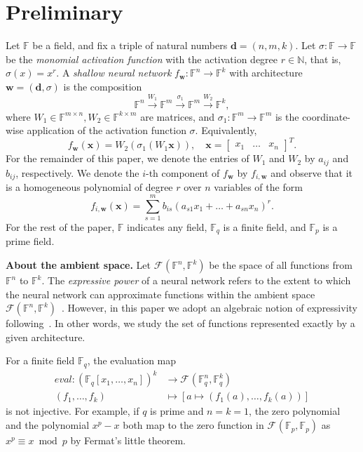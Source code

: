 \documentclass[a4paper]{cas-sc}
\newcommand{\ambSp}[1]{\mathcal{F}_{#1}} %
\newcommand{\xx}{\textbf{x}}    %
\newcommand{\ww}{\mathbf{w}}    %
\newcommand{\dd}{\mathbf{d}}    %
\newcommand{\F}{\mathbb{F}}
\begin{document}
\section{Preliminary}
\label{sec:preliminary}
    Let $\F$ be a field, and fix a triple of natural numbers $\dd=(n,m,k)$. Let $\sigma:\F\to\F$ be the \textit{monomial activation function} with the activation degree $r\in\mathbb{N}$, that is, $\sigma(x)=x^r$. A \textit{shallow neural network} $f_{\ww}:\F^n\to\F^k$ with architecture $\ww=(\dd,\sigma)$ is the composition
    \[
        \F^n\xrightarrow{W_1}\F^m\xrightarrow{\sigma_1}\F^m\xrightarrow{W_2}\F^k,
    \]
    where $W_1\in \F^{m\times n}, W_2\in \F^{k\times m}$ are matrices, and $\sigma_1:\F^m\to\F^m$ is the coordinate-wise application of the activation function $\sigma$. Equivalently,
    \[
        f_{\ww}(\xx)=W_2(\sigma_1(W_1\xx)),\quad \xx=
        \begin{bmatrix}
            x_1 & \dots & x_n
        \end{bmatrix}^T.
    \]
    For the remainder of this paper, we denote the entries of $W_1$ and $W_2$ by $a_{ij}$ and $b_{ij}$, respectively. We denote the $i$-th component of $f_{\ww}$ by $f_{i,\ww}$ and observe that it is a homogeneous polynomial of degree $r$ over $n$ variables of the form
    \begin{equation}
    \label{eq:general-nn-output}
        f_{i,\ww}(\xx)=\sum_{s=1}^{m}b_{is}(a_{s1}x_1+\dots+a_{sn}x_n)^r.
    \end{equation}
    For the rest of the paper, $\F$ indicates any field, $\F_q$ is a finite field, and $\F_p$ is a prime field.

    \noindent
    \textbf{About the ambient space.} Let $\ambSp{}(\F^{n},\F^{k})$ be the space of all functions from $\F^{n}$ to $\F^{k}$. The \textit{expressive power} of a neural network refers to the extent to which the neural network can approximate functions within the ambient space $\mathcal F(\F^{n}, \F^{k})$~\citep{GUHRING20}. However, in this paper we adopt an algebraic notion of expressivity following~\citet{KILEEL19}. In other words, we study the set of functions represented exactly by a given architecture.
    
    
    For a finite field $\F_q$, the evaluation map
    \begin{equation} \label{eq: eval_map}
        \begin{aligned}
            eval: (\F_q[x_1,\dots,x_n])^k&\longrightarrow \ambSp{}(\F_q^{n},\F_q^{k})\\
            (f_1,\dots,f_k)&\longmapsto [a\mapsto (f_1(a),\dots,f_k(a))]
        \end{aligned}
    \end{equation}
    is not injective. For example, if $q$ is prime and $n=k=1$, the zero polynomial and the polynomial $x^p-x$ both map to the zero function in $\ambSp{}(\F_p,\F_p)$ as $x^p\equiv x \bmod p$ by Fermat's little theorem.
\end{document}
